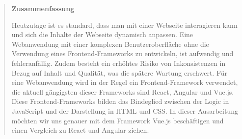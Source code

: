 \documentclass[%
	BCOR=8.25mm,         %
	DIV=12,              %
	parskip=half,				 %
	bibliography=totoc,	 %
	headsepline=on,      %
	]{scrbook}
\begin{document}
\pagestyle{empty}
\begin{quote}
	\vspace*{4cm}

	\begin{center}
		\textbf{\Large\sffamily Zusammenfassung}
	\end{center}
	Heutzutage ist es standard, dass man mit einer Webseite interagieren kann und sich die Inhalte der Webseite dynamisch anpassen.
	Eine Webanwendung mit einer komplexen Benutzeroberfläche ohne die Verwendung eines Frontend-Frameworks zu entwickeln, ist aufwendig und fehleranfällig.
	Zudem besteht ein erhöhtes Risiko von Inkonsistenzen in Bezug auf Inhalt und Qualität, was die spätere Wartung erschwert.
	Für eine Webanwendung wird in der Regel ein Frontend-Framework verwendet, die aktuell gängigsten dieser Frameworks sind React, Angular und Vue.js.
	Diese Frontend-Frameworks bilden das Bindeglied zwischen der Logic in JavaScript und der Darstellung in HTML und CSS.
	In dieser Ausarbeitung möchten wir uns genauer mit dem Framework Vue.js beschäftigen und einen Vergleich zu React und Angular ziehen.

	
\end{quote}
\cleardoubleemptypage

\tableofcontents

\listoffigures
\listoftables
\lstlistoflistings

\mainmatter 
\pagestyle{headings}


%
%
%

\backmatter 

\appendix
%

\end{document}
